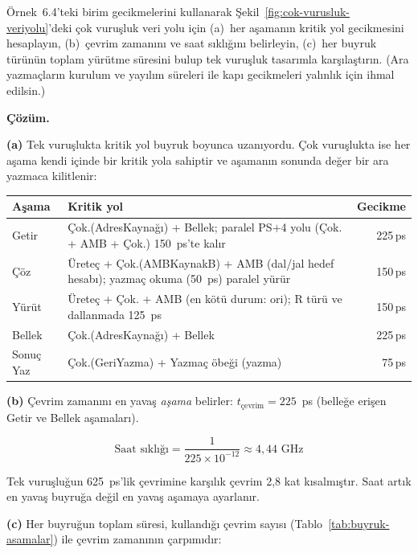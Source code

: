 \begin{ornek}
Örnek~6.4'teki birim gecikmelerini kullanarak Şekil~\ref{fig:cok-vurusluk-veriyolu}'deki çok vuruşluk veri yolu için (a)~her aşamanın kritik yol gecikmesini hesaplayın, (b)~çevrim zamanını ve saat sıklığını belirleyin, (c)~her buyruk türünün toplam yürütme süresini bulup tek vuruşluk tasarımla karşılaştırın. (Ara yazmaçların kurulum ve yayılım süreleri ile kapı gecikmeleri yalınlık için ihmal edilsin.)

\tcblower
\textbf{Çözüm.}

\textbf{(a)} Tek vuruşlukta kritik yol buyruk boyunca uzanıyordu. Çok vuruşlukta ise her aşama kendi içinde bir kritik yola sahiptir ve aşamanın sonunda değer bir ara yazmaca kilitlenir:

\begin{center}
\small
\begin{tabular}{@{}lp{8.2cm}r@{}}
\toprule
\textbf{Aşama} & \textbf{Kritik yol} & \textbf{Gecikme} \\
\midrule
Getir & Çok.(AdresKaynağı) + Bellek; paralel PS$+$4 yolu (Çok. + AMB + Çok.) 150~ps'te kalır & 225\,ps \\
Çöz & Üreteç + Çok.(AMBKaynakB) + AMB (dal/jal hedef hesabı); yazmaç okuma (50~ps) paralel yürür & 150\,ps \\
Yürüt & Üreteç + Çok. + AMB (en kötü durum: ori); R türü ve dallanmada 125~ps & 150\,ps \\
Bellek & Çok.(AdresKaynağı) + Bellek & 225\,ps \\
Sonuç Yaz & Çok.(GeriYazma) + Yazmaç öbeği (yazma) & 75\,ps \\
\bottomrule
\end{tabular}
\end{center}

\textbf{(b)} Çevrim zamanını en yavaş \emph{aşama} belirler: $t_{\text{çevrim}} = 225$~ps (belleğe erişen Getir ve Bellek aşamaları).

\[
\text{Saat sıklığı} = \frac{1}{225 \times 10^{-12}} \approx 4{,}44 \text{~GHz}
\]

Tek vuruşluğun 625~ps'lik çevrimine karşılık çevrim 2{,}8 kat kısalmıştır. Saat artık en yavaş buyruğa değil en yavaş aşamaya ayarlanır.

\textbf{(c)} Her buyruğun toplam süresi, kullandığı çevrim sayısı (Tablo~\ref{tab:buyruk-asamalar}) ile çevrim zamanının çarpımıdır:


\end{ornek}
